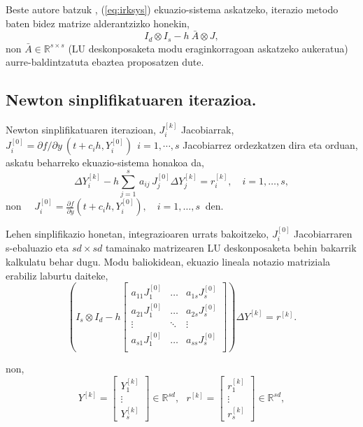 Beste autore batzuk \cite{Brugnano2014,Jay2009}, (\ref{eq:irksys}) ekuazio-sistema askatzeko, iterazio metodo baten bidez matrize alderantzizko honekin,
\begin{equation}
I_d \otimes I_s -h \ \bar{A} \otimes J,
\end{equation}
non $\bar{A} \in \mathbb{R}^{s \times s}$ (LU deskonposaketa modu eraginkorragoan askatzeko aukeratua) aurre-baldintzatuta ebaztea proposatzen dute. 


\subsection*{Newton sinplifikatuaren iterazioa.}

Newton sinplifikatuaren iterazioan, $J_i^{[k]}$ Jacobiarrak,  $J_i^{[0]}=\partial f / \partial y \ (t+c_ih, Y_i^{[0]}) \ \ i=1,\cdots,s$ Jacobiarrez ordezkatzen dira eta orduan, askatu beharreko ekuazio-sistema honakoa da,
\begin{equation}
\label{eq:irks}
\Delta Y_{i}^{[k]}  - h \sum_{j=1}^{s}\, a_{ij}\, J_j^{[0]} \Delta Y_{j}^{[k]} = r_i^{[k]}, \quad  i=1 ,\ldots, s,
\end{equation}
non $\quad  J_i^{[0]}=\frac{\partial f}{\partial y}(t + c_i h,Y_{i}^{[0]}), \quad  i=1,\ldots,s \ $ den.

Lehen sinplifikazio honetan, integrazioaren urrats bakoitzeko,  $J_i^{[0]}$ Jacobiarraren s-ebaluazio eta $sd \times sd$ tamainako matrizearen LU deskonposaketa behin bakarrik kalkulatu behar dugu. Modu baliokidean, ekuazio lineala notazio matriziala erabiliz laburtu daiteke,
\begin{equation*}
\label{eq:805}
\left (I_s \otimes I_d - h  
\begin{bmatrix}
a_{11}  J_1^{[0]} & \dots & a_{1s}  J_s^{[0]} \\
a_{21}  J_1^{[0]} & \dots & a_{2s}  J_s^{[0]} \\
\vdots            & \ddots & \vdots \\
a_{s1}  J_1^{[0]} & \dots & a_{ss}  J_s^{[0]} \\ 
\end{bmatrix} \right) \Delta Y^{[k]} =r^{[k]}.
\end{equation*}

non,
\begin{equation*}
\label{eq:806}
Y^{[k]}=\begin{bmatrix}
Y_1^{[k]} \\
\vdots \\
Y_s^{[k]}
\end{bmatrix} \in \mathbb{R}^{sd}, \ \ \
r^{[k]}=\begin{bmatrix}
r_1^{[k]} \\
\vdots \\
r_s^{[k]}
\end{bmatrix} \in \mathbb{R}^{sd},
\end{equation*}

